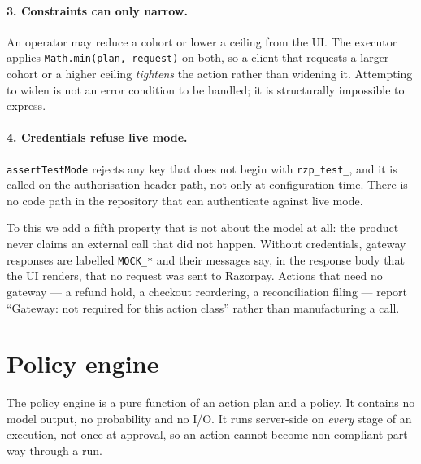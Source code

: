 \documentclass[10pt,twocolumn,a4paper]{article}
\newcommand{\code}[1]{\texttt{\small #1}}
\begin{document}
\paragraph{3. Constraints can only narrow.}
An operator may reduce a cohort or lower a ceiling from the UI. The executor
applies \code{Math.min(plan, request)} on both, so a client that requests a
larger cohort or a higher ceiling \emph{tightens} the action rather than widening
it. Attempting to widen is not an error condition to be handled; it is
structurally impossible to express.

\paragraph{4. Credentials refuse live mode.}
\code{assertTestMode} rejects any key that does not begin with
\code{rzp\_test\_}, and it is called on the authorisation header path, not only
at configuration time. There is no code path in the repository that can
authenticate against live mode.

To this we add a fifth property that is not about the model at all: the product
never claims an external call that did not happen. Without credentials, gateway
responses are labelled \code{MOCK\_*} and their messages say, in the response
body that the UI renders, that no request was sent to Razorpay. Actions that need
no gateway --- a refund hold, a checkout reordering, a reconciliation filing ---
report ``Gateway: not required for this action class'' rather than manufacturing
a call.

\section{Policy engine}
\label{sec:policy}

The policy engine is a pure function of an action plan and a policy. It contains
no model output, no probability and no I/O. It runs server-side on \emph{every}
stage of an execution, not once at approval, so an action cannot become
non-compliant part-way through a run.
\end{document}
